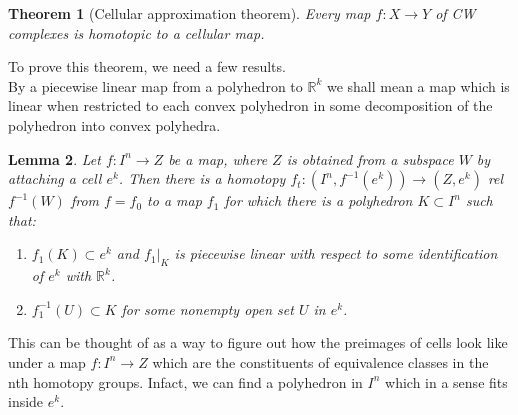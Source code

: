 \documentclass[12pt]{extarticle}
\newcounter{pic}[page]
\newcounter{fig}[page]
\numberwithin{equation}{section}
\newtheorem{thm}{Theorem}[section]
\newtheorem{lem}[thm]{Lemma}
\newcommand{\R}{\mathbb{R}}
\begin{document}
\begin{thm}[Cellular approximation theorem]
Every map $f :X\to Y$ of CW complexes is homotopic to a cellular map.
\end{thm}

To prove this theorem, we need a few results.\\

By a piecewise linear map from a polyhedron to $\R^k$ we shall mean a map which is linear when restricted to each convex polyhedron in some decomposition of the polyhedron into convex polyhedra.\\

\begin{lem}
Let $f :I^n\to Z$ be a map, where $Z$ is obtained from a subspace $W$ by
attaching a cell $e^k$. Then there is a homotopy $f_t :(I^n,f^{-1}(e^k))\to(Z,e^k)$ rel $f^{-1}(W)$
from $f =f_0$ to a map $f_1$ for which there is a polyhedron $K \subset I^n$ such that:

\begin{enumerate}
    \item $f_1(K) \subset e^k$ and $f_1|_K$ is piecewise linear with respect to some identification of $e^k$ with $\R^k$.
    
    \item $f^{-1}_1 (U) \subset K$ for some nonempty open set $U$ in $e^k$.
\end{enumerate}
\end{lem}

This can be thought of as a way to figure out how the preimages of cells look like under a map $f:I^n\to Z$ which are the constituents of equivalence classes in the nth homotopy groups. Infact, we can find a polyhedron in $I^n$ which in a sense fits inside $e^k$.\\
\end{document}
